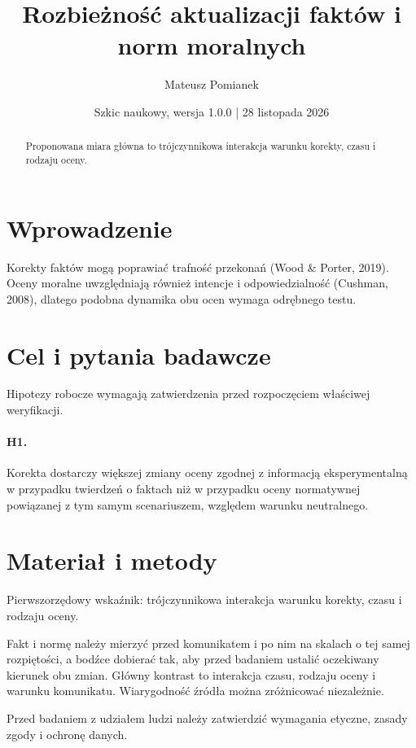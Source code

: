 \documentclass[11pt,a4paper]{article}
\title{Rozbieżność aktualizacji faktów i norm moralnych}
\author{Mateusz Pomianek}
\date{Szkic naukowy, wersja 1.0.0 | 28 listopada 2026}
\begin{document}
\maketitle

\begin{abstract}

Proponowana miara główna to trójczynnikowa interakcja warunku korekty, czasu i rodzaju oceny.

\end{abstract}

\section{Wprowadzenie}

Korekty faktów mogą poprawiać trafność przekonań (Wood \& Porter, 2019). Oceny moralne uwzględniają również intencje i odpowiedzialność (Cushman, 2008), dlatego podobna dynamika obu ocen wymaga odrębnego testu.

\section{Cel i pytania badawcze}

Hipotezy robocze wymagają zatwierdzenia przed rozpoczęciem właściwej weryfikacji.

\paragraph{H1.} Korekta dostarczy większej zmiany oceny zgodnej z informacją eksperymentalną w przypadku twierdzeń o faktach niż w przypadku oceny normatywnej powiązanej z tym samym scenariuszem, względem warunku neutralnego.

\section{Materiał i metody}

Pierwszorzędowy wskaźnik: trójczynnikowa interakcja warunku korekty, czasu i rodzaju oceny.

Fakt i normę należy mierzyć przed komunikatem i po nim na skalach o tej samej rozpiętości, a bodźce dobierać tak, aby przed badaniem ustalić oczekiwany kierunek obu zmian. Główny kontrast to interakcja czasu, rodzaju oceny i warunku komunikatu. Wiarygodność źródła można zróżnicować niezależnie.

Przed badaniem z udziałem ludzi należy zatwierdzić wymagania etyczne, zasady zgody i ochronę danych.
\end{document}
